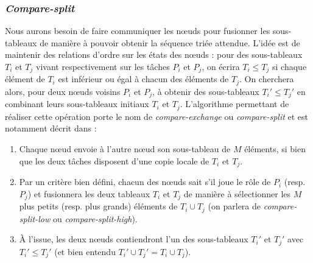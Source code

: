 \subsubsection{\textit{Compare-split}}

Nous aurons besoin de faire communiquer les nœuds pour fusionner les sous-tableaux de manière à pouvoir obtenir la séquence triée attendue. L'idée est de maintenir des relations d'ordre sur les états des nœuds : pour des sous-tableaux $T_i$ et $T_j$ vivant respectivement sur les tâches $P_i$ et $P_j$, on écrira $T_i \leq T_j$ si chaque élément de $T_i$ est inférieur ou égal à chacun des éléments de $T_j$. On cherchera alors, pour deux nœuds voisins $P_i$ et $P_j$, à obtenir des sous-tableaux $T_i' \leq T_j'$ en combinant leurs sous-tableaux initiaux $T_i$ et $T_j$. L'algorithme permettant de réaliser cette opération porte le nom de \textit{compare-exchange} ou \textit{compare-split} et est notamment décrit dans \cite{GRAMA} :

\begin{enumerate}
\item Chaque nœud envoie à l'autre nœud son sous-tableau de $M$ éléments, si bien que les deux tâches disposent d'une copie locale de $T_i$ et $T_j$.
\item Par un critère bien défini, chacun des nœuds sait s'il joue le rôle de $P_i$ (resp. $P_j$) et fusionnera les deux tableaux $T_i$ et $T_j$ de manière à sélectionner les $M$ plus petits (resp. plus grands) éléments de $T_i \cup T_j$ (on parlera de \textit{compare-split-low} ou \textit{compare-split-high}).
\item À l'issue, les deux nœuds contiendront l'un des sous-tableaux $T_i'$ et $T_j'$ avec $T_i' \leq T_j'$ (et bien entendu $T_i' \cup T_j' = T_i \cup T_j$).
\end{enumerate}

